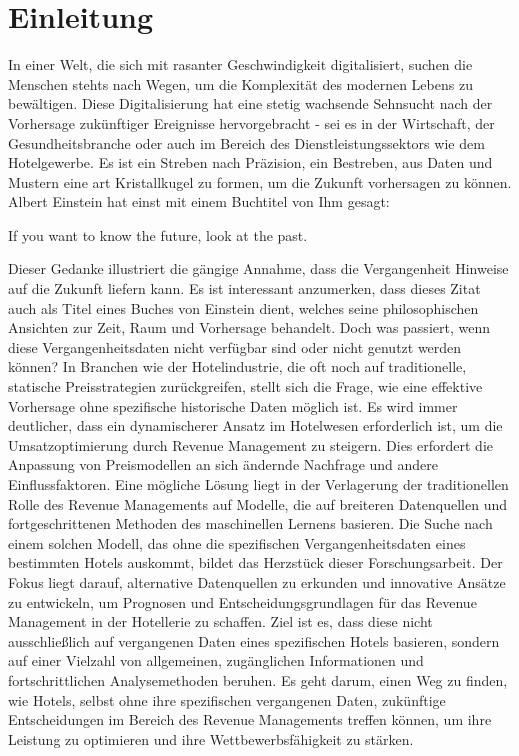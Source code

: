 \chapter{Einleitung}
\label{chap:einleitung}
In einer Welt, die sich mit rasanter Geschwindigkeit digitalisiert, suchen die Menschen stehts nach Wegen, um die Komplexität des modernen Lebens zu bewältigen. Diese Digitalisierung hat eine stetig wachsende Sehnsucht nach der Vorhersage zukünftiger Ereignisse hervorgebracht - sei es in der Wirtschaft, der Gesundheitsbranche oder auch im Bereich des Dienstleistungssektors wie dem Hotelgewerbe. Es ist ein Streben nach Präzision, ein Bestreben, aus Daten und Mustern eine art Kristallkugel zu formen, um die Zukunft vorhersagen zu können.
\newline
\newline
Albert Einstein hat einst mit einem Buchtitel von Ihm gesagt: 
\begin{zitat}
    If you want to know the future, look at the past. \cite{AE_zitat}
\end{zitat}
Dieser Gedanke illustriert die gängige Annahme, dass die Vergangenheit Hinweise auf die Zukunft liefern kann. Es ist interessant anzumerken, dass dieses Zitat auch als Titel eines Buches von Einstein dient, welches seine philosophischen Ansichten zur Zeit, Raum und Vorhersage behandelt.
\newline
\newline
Doch was passiert, wenn diese Vergangenheitsdaten nicht verfügbar sind oder nicht genutzt werden können? In Branchen wie der Hotelindustrie, die oft noch auf traditionelle, statische Preisstrategien zurückgreifen, stellt sich die Frage, wie eine effektive Vorhersage ohne spezifische historische Daten möglich ist. 
\newline
\newline
Es wird immer deutlicher, dass ein dynamischerer Ansatz im Hotelwesen erforderlich ist, um die Umsatzoptimierung durch Revenue Management zu steigern. Dies erfordert die Anpassung von Preismodellen an sich ändernde Nachfrage und andere Einflussfaktoren. Eine mögliche Lösung liegt in der Verlagerung der traditionellen Rolle des Revenue Managements auf Modelle, die auf breiteren Datenquellen und fortgeschrittenen Methoden des maschinellen Lernens basieren.
\newline 
\newline
Die Suche nach einem solchen Modell, das ohne die spezifischen Vergangenheitsdaten eines bestimmten Hotels auskommt, bildet das Herzstück dieser Forschungsarbeit. Der Fokus liegt darauf, alternative Datenquellen zu erkunden und innovative Ansätze zu entwickeln, um Prognosen und Entscheidungsgrundlagen für das Revenue Management in der Hotellerie zu schaffen. Ziel ist es, dass diese nicht ausschließlich auf vergangenen Daten eines spezifischen Hotels basieren, sondern auf einer Vielzahl von allgemeinen, zugänglichen Informationen und fortschrittlichen Analysemethoden beruhen. Es geht darum, einen Weg zu finden, wie Hotels, selbst ohne ihre spezifischen vergangenen Daten, zukünftige Entscheidungen im Bereich des Revenue Managements treffen können, um ihre Leistung zu optimieren und ihre Wettbewerbsfähigkeit zu stärken.


